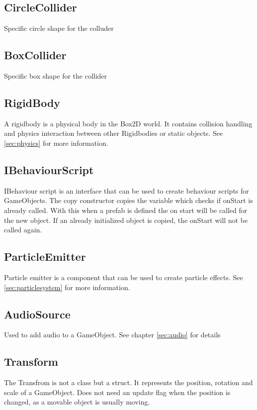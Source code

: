 \subsection{CircleCollider}
Specific circle shape for the colluder
\subsection{BoxCollider}
Specific box shape for the collider

\subsection{RigidBody}
A rigidbody is a physical body in the Box2D world. It contains collision handling and physics interaction between other Rigidbodies or static objects.
See \autoref{sec:physics} for more information.

\subsection{IBehaviourScript}
IBehaviour script is an interface that can be used to create behaviour scripts for GameObjects.
The copy constructor copies the variable which checks if onStart is already called. 
With this when a prefab is defined the on start will be called for the new object.
If an already initialized object is copied, the onStart will not be called again.

\subsection{ParticleEmitter}
Particle emitter is a component that can be used to create particle effects.
See \autoref{sec:particlesystem} for more information.

\subsection{AudioSource}
Used to add audio to a GameObject. See chapter \autoref{sec:audio} for details

\subsection{Transform}
The Transfrom is not a class but a struct. It represents the position, rotation and scale of a GameObject.
Does not need an update flag when the position is changed, as a movable object is usually moving.


